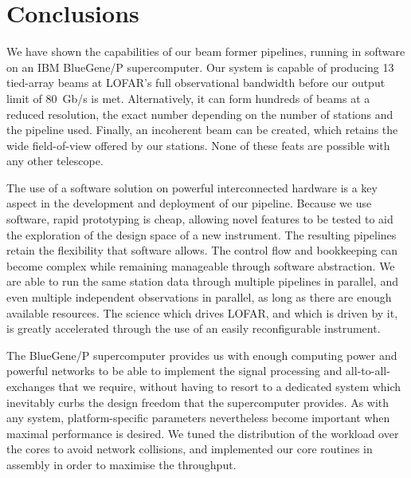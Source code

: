 \documentclass{llncs}
\begin{document}

\section{Conclusions}
\label{Sec:conclusions}

We have shown the capabilities of our beam former pipelines, running in software on an IBM BlueGene/P supercomputer. Our system is capable of producing 13 tied-array beams at LOFAR's full observational bandwidth before our output limit of 80~Gb/s is met. Alternatively, it can form hundreds of beams at a reduced resolution, the exact number depending on the number of stations and the pipeline used. Finally, an incoherent beam can be created, which retains the wide field-of-view offered by our stations. None of these feats are possible with any other telescope.

The use of a software solution on powerful interconnected hardware is a key aspect in the development and deployment of our pipeline. Because we use software, rapid prototyping is cheap, allowing novel features to be tested to aid the exploration of the design space of a new instrument. The resulting pipelines retain the flexibility that software allows. The control flow and bookkeeping can become complex while remaining manageable through software abstraction. We are able to run the same station data through multiple pipelines in parallel, and even multiple independent observations in parallel, as long as there are enough available resources. The science which drives LOFAR, and which is driven by it, is greatly accelerated through the use of an easily reconfigurable instrument.

The BlueGene/P supercomputer provides us with enough computing power and powerful networks to be able to implement the signal processing and all-to-all-exchanges that we require, without having to resort to a dedicated system which inevitably curbs the design freedom that the supercomputer provides. As with any system, platform-specific parameters nevertheless become important when maximal performance is desired. We tuned the distribution of the workload over the cores to avoid network collisions, and implemented our core routines in assembly in order to maximise the throughput. 



\end{document}
